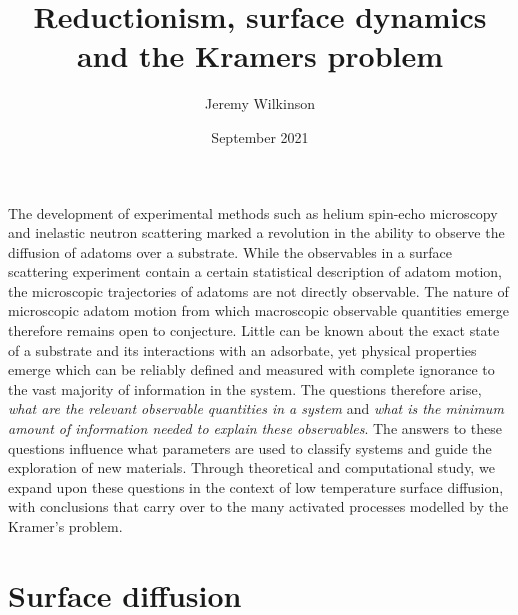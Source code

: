 \documentclass[7pt]{article}
\title{Reductionism, surface dynamics and the Kramers problem}
\author{Jeremy Wilkinson}
\date{September 2021}
\begin{document}
\maketitle

The development of experimental methods such as helium spin-echo microscopy\cite{FouquetHSEM, JardineHSEM} and inelastic neutron scattering\cite{Wright1983} marked a revolution in the ability to observe the diffusion of adatoms over a substrate. While the observables in a surface scattering experiment contain a certain statistical description of adatom motion\cite{vanHowe}, the microscopic trajectories of adatoms are not directly observable. The nature of microscopic adatom motion from which macroscopic observable quantities emerge therefore remains open to conjecture. Little can be known about the exact state of a substrate and its interactions with an adsorbate, yet physical properties emerge which can be reliably defined and measured with complete ignorance to the vast majority of information in the system. The questions therefore arise, \emph{what are the relevant observable quantities in a system} and \emph{what is the minimum amount of information needed to explain these observables}. The answers to these questions influence what parameters are used to classify systems and guide the exploration of new materials. Through theoretical and computational study, we expand upon these questions in the context of low temperature surface diffusion, with conclusions that carry over to the many activated processes modelled by the Kramer's problem. 


\section*{Surface diffusion}
\end{document}
